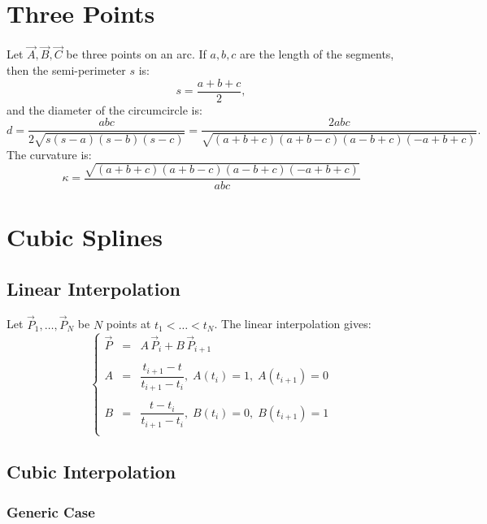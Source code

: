 \documentclass[aps,12pt]{revtex4}
\begin{document}
\section{Three Points}

Let $\vec{A}, \vec{B}, \vec{C}$ be three points on an arc.
If $a,b,c$ are the length of the segments, then the semi-perimeter $s$ is:
\begin{equation}
s = \dfrac{a+b+c}{2},
\end{equation}
and the diameter of the circumcircle is:
\begin{equation}
	d = \dfrac{abc}{2\sqrt{s(s-a)(s-b)(s-c)}} = \dfrac{2abc}{\sqrt{(a+b+c)(a+b-c)(a-b+c)(-a+b+c)}}.
\end{equation}
The curvature is:
\begin{equation}
	\kappa = \dfrac{\sqrt{(a+b+c)(a+b-c)(a-b+c)(-a+b+c)}}{abc}
\end{equation}

\section{Cubic Splines}

\subsection{Linear Interpolation}
Let $\vec{P}_1,\ldots,\vec{P}_{N}$ be $N$ points at $t_1<\ldots<t_N$.
The linear interpolation gives:
\begin{equation}
\left\lbrace
\begin{array}{rcl}
	\vec{P} & = & A \, \vec{P}_i + B \, \vec{P}_{i+1} \\
	\\
	A & = & \dfrac{t_{i+1}-t}{t_{i+1}-t_i}, \; A(t_i) = 1,\;A(t_{i+1})=0\\
	\\
	B & = & \dfrac{t-t_i}{t_{i+1}-t_i}, \; B(t_i) = 0,\;B(t_{i+1})=1\\
	\end{array}
\right.
\end{equation}


\subsection{Cubic Interpolation}

\subsubsection{Generic Case}
\end{document}
